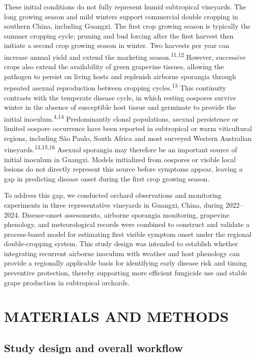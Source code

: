 \documentclass{article}
\begin{document}
These initial conditions do not fully represent humid subtropical vineyards.
The long growing season and mild winters support commercial double cropping
in southern China, including Guangxi. The first crop growing season is
typically the summer cropping cycle; pruning and bud forcing after the first
harvest then initiate a second crop growing season in winter. Two harvests
per year can increase annual yield and extend the marketing season.\textsuperscript{11,12}
However, successive crops also extend the availability
of green grapevine tissues, allowing the pathogen to persist on living hosts
and replenish airborne sporangia through repeated asexual reproduction
between cropping cycles.\textsuperscript{13} This continuity contrasts
with the temperate disease cycle, in which resting oospores survive winter
in the absence of susceptible host tissue and germinate to provide the
initial inoculum.\textsuperscript{4,14} Predominantly clonal
populations, asexual persistence or limited oospore occurrence have been
reported in subtropical or warm viticultural regions, including São Paulo,
South Africa and most surveyed Western Australian vineyards.\textsuperscript{13,15,16}
Asexual sporangia may
therefore be an important source of initial inoculum in Guangxi. Models
initialized from oospores or visible local lesions do not directly represent
this source before symptoms appear, leaving a gap in predicting disease
onset during the first crop growing season.

To address this gap, we conducted orchard observations and monitoring
experiments in three representative vineyards in Guangxi, China, during
2022--2024. Disease-onset assessments, airborne sporangia monitoring,
grapevine phenology, and meteorological records were combined to construct
and validate a process-based model for estimating first visible symptom
onset under the regional double-cropping system. This study design was
intended to establish whether integrating recurrent airborne inoculum with
weather and host phenology can provide a regionally applicable basis for
identifying early disease risk and timing preventive protection, thereby
supporting more efficient fungicide use and stable grape production in
subtropical orchards.

\section{MATERIALS AND METHODS}\label{materials-and-methods}

\subsection{Study design and overall
workflow}\label{study-design-and-overall-workflow}
\end{document}
